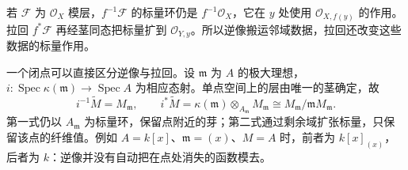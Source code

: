 \ProseParagraphBreak
若 \(\mathcal F\) 为 \(\mathcal O_X\) 模层，\(f^{-1}\mathcal F\) 的标量环仍是 \(f^{-1}\mathcal O_X\)，它在 \(y\) 处使用 \(\mathcal O_{X,f(y)}\) 的作用。拉回 \(f^*\mathcal F\) 再经茎同态把标量扩到 \(\mathcal O_{Y,y}\)。所以逆像搬运邻域数据，拉回还改变这些数据的标量作用。

\ProseParagraphBreak
一个闭点可以直接区分逆像与拉回。设 \(\mathfrak m\) 为 \(A\) 的极大理想，\(i:\operatorname{Spec}\kappa(\mathfrak m)\to\operatorname{Spec}A\) 为相应态射。单点空间上的层由唯一的茎确定，故
\[
	i^{-1}\widetilde M=M_{\mathfrak m},\qquad i^*\widetilde M =\kappa(\mathfrak m)\otimes_{A_{\mathfrak m}}M_{\mathfrak m} \cong M_{\mathfrak m}/\mathfrak mM_{\mathfrak m}.
\]
第一式仍以 \(A_{\mathfrak m}\) 为标量环，保留点附近的芽；第二式通过剩余域扩张标量，只保留该点的纤维值。例如 \(A=k[x]\)、\(\mathfrak m=(x)\)、\(M=A\) 时，前者为 \(k[x]_{(x)}\)，后者为 \(k\)：逆像并没有自动把在点处消失的函数模去。

